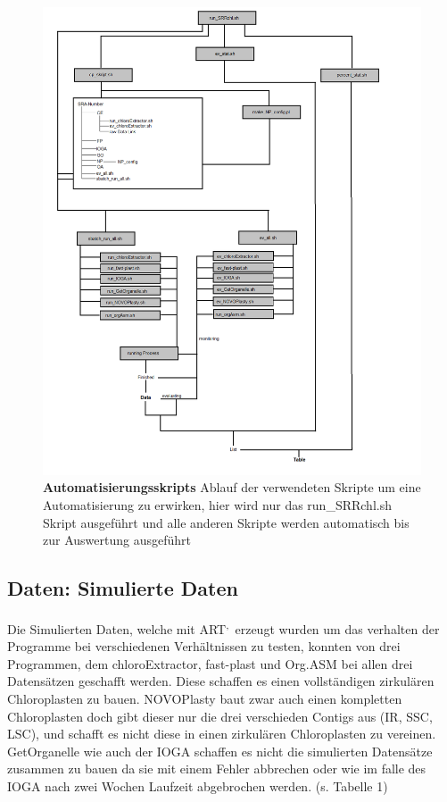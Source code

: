 \documentclass{scrartcl}
\begin{document}
\begin{figure}
\includegraphics[width=.9\linewidth]{./Diagram_Master.png}
\caption[Automatisierungsskripts]{\textbf{Automatisierungsskripts} Ablauf der verwendeten Skripte um eine Automatisierung zu erwirken, hier wird nur das run\_SRRchl.sh Skript ausgeführt und alle anderen Skripte werden automatisch bis zur Auswertung ausgeführt}
\end{figure}


\subsection{Daten: Simulierte Daten}
\label{sec-4-2}
Die Simulierten Daten, welche mit ART\footnotemark[44]{}\textsuperscript{,}\,\footnotemark[45]{} erzeugt wurden um das verhalten der Programme bei verschiedenen Verhältnissen zu testen, konnten von drei Programmen, dem chloroExtractor, fast-plast und Org.ASM 
bei allen drei Datensätzen geschafft werden. Diese schaffen es einen vollständigen zirkulären Chloroplasten zu bauen. NOVOPlasty baut zwar auch einen kompletten Chloroplasten doch gibt dieser 
nur die drei verschieden Contigs aus (IR, SSC, LSC), und schafft es nicht diese in einen zirkulären Chloroplasten zu vereinen. GetOrganelle wie auch der IOGA schaffen es nicht die
simulierten Datensätze zusammen zu bauen da sie mit einem Fehler abbrechen oder wie im falle des IOGA nach zwei Wochen Laufzeit abgebrochen werden. (s. Tabelle 1) 
\end{document}

